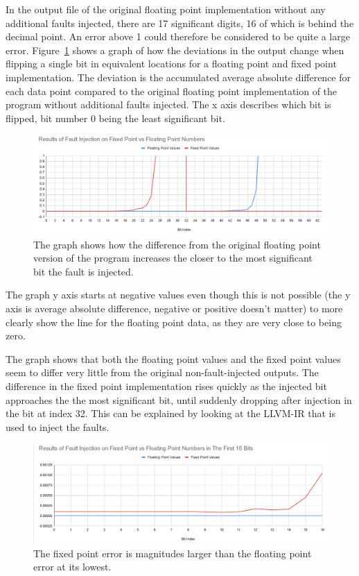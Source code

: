 In the output file of the original floating point implementation without any additional faults injected, there are 17 significant digits, 16 of which is behind the decimal point. An error above 1 could therefore be considered to be quite a large error. Figure~\ref{fig:graph_fixed_vs_float_error} shows a graph of how the  deviations in the output change when flipping a single bit in equivalent locations for a floating point and fixed point implementation. The deviation is the accumulated average absolute difference for each data point compared to the original floating point implementation of the program without additional faults injected. The x axis describes which bit is flipped, bit number 0 being the least significant bit.

\begin{figure}[h!]
    \centering
    \includegraphics[width=0.5\linewidth]{Images/graph_float_vs_fixed_fault_injection_results.png}
    \caption{The graph shows how the difference from the original floating point version of the program increases the closer to the most significant bit the fault is injected. }
    \label{fig:graph_fixed_vs_float_error}
\end{figure}


The graph y axis starts at negative values even though this is not possible (the y axis is average absolute difference, negative or positive doesn't matter) to more clearly show the line for the floating point data, as they are very close to being zero.

The graph shows that both the floating point values and the fixed point values seem to differ very little from the original non-fault-injected outputs. The difference in the fixed point implementation rises quickly as the injected bit approaches the the most significant bit, until suddenly dropping after injection in the bit at index 32. This can be explained by looking at the LLVM-IR that is used to inject the faults. 


\begin{figure}[h!]
    \centering
    \includegraphics[width=0.5\linewidth]{graph_fault_injection_fix_vs_float_first_16_bits.png}
    \caption{The fixed point error is magnitudes larger than the floating point error at its lowest.}
    \label{fig:graph_fixed_vs_float_error_first_16}
\end{figure}

